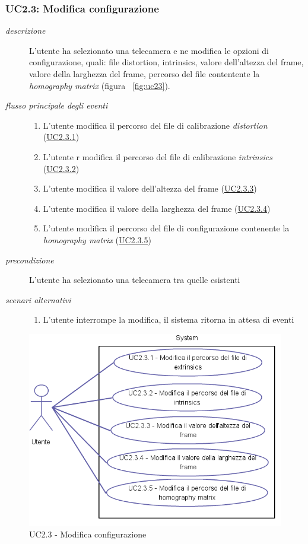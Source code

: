 \subsubsection{UC2.3: Modifica configurazione} \label{sec:UC2.3}
\begin{description}
\item[\em{descrizione }]L'utente ha selezionato una telecamera e ne modifica le opzioni di configurazione, quali: file distortion, intrinsics, valore dell'altezza del frame, valore della larghezza del frame, percorso del file contentente la \textit{homography matrix} (figura ~\ref{fig:uc23}).
\item[\em{flusso principale degli eventi }] \mbox{}
\begin{enumerate}
\item L'utente modifica il percorso del file di calibrazione \textit{distortion} (\hyperref[sec:uc2.3.1]{UC2.3.1})
\item L'utente r modifica il percorso del file di calibrazione \textit{intrinsics} (\hyperref[sec:uc2.3.2]{UC2.3.2})
\item L'utente modifica il valore dell'altezza del frame (\hyperref[sec:uc2.3.3]{UC2.3.3})
\item L'utente modifica il valore della larghezza del frame (\hyperref[sec:uc2.3.4]{UC2.3.4})
\item L'utente modifica il percorso del file di configurazione contenente la \textit{homography matrix} (\hyperref[sec:uc2.3.5]{UC2.3.5})
\end{enumerate}
\item[\em{precondizione }] L'utente ha selezionato una telecamera tra quelle esistenti
\item[\em{scenari alternativi }] \mbox{} 
\begin{enumerate} 
\item L'utente interrompe la modifica, il sistema ritorna in attesa di eventi
\end{enumerate}
\end{description}

\begin{figure}[htpb] 
\centering 
\includegraphics[scale=0.4]{./images/uc23.png} 
\caption{UC2.3 - Modifica configurazione} 
\label{fig:uc2.3}
\end{figure} 

